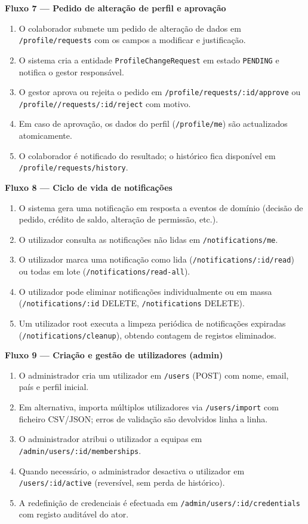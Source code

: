 \documentclass[11pt,a4paper,twoside]{article}
\begin{document}
\textbf{Fluxo 7 — Pedido de alteração de perfil e aprovação}
\begin{enumerate}
  \item O colaborador submete um pedido de alteração de dados em \texttt{/profile/requests} com os campos a modificar e justificação.
  \item O sistema cria a entidade \texttt{ProfileChangeRequest} em estado \texttt{PENDING} e notifica o gestor responsável.
  \item O gestor aprova ou rejeita o pedido em \texttt{/profile/requests/:id/approve} ou \texttt{/profile/\newline/requests/:id/reject} com motivo.
  \item Em caso de aprovação, os dados do perfil (\texttt{/profile/me}) são actualizados atomicamente.
  \item O colaborador é notificado do resultado; o histórico fica disponível em \texttt{/profile/requests/history}.
\end{enumerate}

\textbf{Fluxo 8 — Ciclo de vida de notificações}
\begin{enumerate}
  \item O sistema gera uma notificação em resposta a eventos de domínio (decisão de pedido, crédito de saldo, alteração de permissão, etc.).
  \item O utilizador consulta as notificações não lidas em \texttt{/notifications/me}.
  \item O utilizador marca uma notificação como lida (\texttt{/notifications/:id/read}) ou todas em lote (\texttt{/notifications/read-all}).
  \item O utilizador pode eliminar notificações individualmente ou em massa (\texttt{/notifications/:id} DELETE, \texttt{/notifications} DELETE).
  \item Um utilizador root executa a limpeza periódica de notificações expiradas (\texttt{/notifications/cleanup}), obtendo contagem de registos eliminados.
\end{enumerate}

\textbf{Fluxo 9 — Criação e gestão de utilizadores (admin)}
\begin{enumerate}
  \item O administrador cria um utilizador em \texttt{/users} (POST) com nome, email, país e perfil inicial.
  \item Em alternativa, importa múltiplos utilizadores via \texttt{/users/import} com ficheiro CSV/JSON; erros de validação são devolvidos linha a linha.
  \item O administrador atribui o utilizador a equipas em \texttt{/admin/users/:id/memberships}.
  \item Quando necessário, o administrador desactiva o utilizador em \texttt{/users/:id/active} (reversível, sem perda de histórico).
  \item A redefinição de credenciais é efectuada em \texttt{/admin/users/:id/credentials} com registo auditável do ator.
\end{enumerate}
\end{document}
